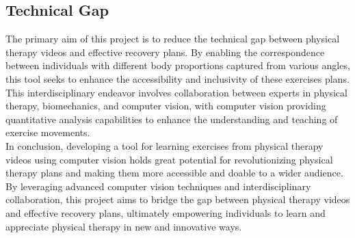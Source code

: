 \subsection{Technical Gap}
\indent The primary aim of this project is to reduce the technical gap between physical therapy videos and 
effective recovery plans. By enabling the correspondence between individuals with different body proportions 
captured from various angles, this tool seeks to enhance the accessibility and inclusivity of these exercises plans. 
This interdisciplinary endeavor involves collaboration between experts in physical therapy, biomechanics, and computer 
vision, with computer vision providing quantitative analysis capabilities to enhance the understanding and 
teaching of exercise movements.
\\
\indent In conclusion, developing a tool for learning exercises from physical therapy videos using computer vision holds 
great potential for revolutionizing physical therapy plans and making them more accessible and doable to a wider 
audience. By leveraging advanced computer vision techniques and interdisciplinary collaboration, 
this project aims to bridge the gap between physical therapy videos and effective recovery plans, 
ultimately empowering individuals to learn and appreciate physical therapy in new and innovative ways.



